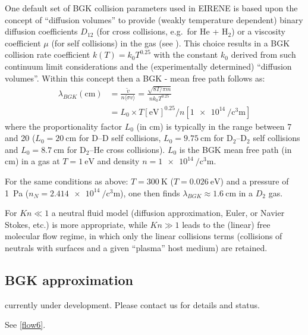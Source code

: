 One default set of \ac{BGK} collision parameters used in EIRENE is based upon
the concept of ``diffusion volumes'' to provide (weakly temperature dependent)
binary diffusion coefficients $D_{12}$ (for cross collisions, e.g.\ for He +
H$_2$) or a viscosity coefficient $\mu$ (for self collisions) in the gas (see
\cite{kn:Reiter94}).
This choice results in a \ac{BGK} collision rate coefficient $k(T)= k_0
  T^{0.25}$  with the constant $k_0$ derived from such continuum limit
considerations and the (experimentally determined) ``diffusion volumes''.
Within this concept then a \ac{BGK} - mean free path \cite{kn:Kotov-Dis}
follows as:
\begin{align}
  \lambda_{BGK}
  (\si{\centi\metre}) & = \frac{\tilde{v}}{n \langle \sigma v\rangle} =
  \frac{\sqrt{8T/\pi m}} {n k_0 T^{0.25}} \nonumber                     \\
                      & = L_0 \times T[\si{\electronvolt}]^{0.25} /
  n[\SI{1e14}{\per\cubic\centi\metre}]
\end{align}
where the proportionality factor $L_0$ (in \si{\centi\metre}) is typically in
the range between 7 and 20 ($L_0 = \SI{20}{\centi\metre}
$ for D--D self collisions, $L_0 = \SI{9.75}{\centi\metre}$ for D$_2$--D$_2$
self collisions and $L_0 = \SI{8.7}{\centi\metre}$ for D$_2$--He cross
collisions).
$L_0$ is the \ac{BGK} mean free path (in \si{\centi\metre}) in a gas at $T =
  \SI{1}{\electronvolt}$ and density $n =\SI{1e14}{\per\cubic\centi\metre}$.

For the same conditions as above: $T=\SI{300}{\kelvin}$
($T=\SI{0.026}{\electronvolt}$) and a pressure of \SI{1}{\pascal}
($n_N=\SI{2.414e14}{\per\cubic\centi\metre}$), one then finds
$\lambda_{BGK}\approx \SI{1.6}{\centi\metre}$ in a $D_2$ gas.

For $Kn\ll 1$ a neutral fluid model (diffusion approximation, Euler, or Navier
Stokes, etc.) is more appropriate, while $Kn \gg 1$ leads to the (linear) free
molecular flow regime, in which only the linear collisions terms (collisions of
neutrals with surfaces and a given ``plasma'' host medium) are retained.

\subsection{\ac{BGK} approximation}\label{sec1-bgk}

currently under development.
Please contact us for details and status.

See \cref{flow6}.


